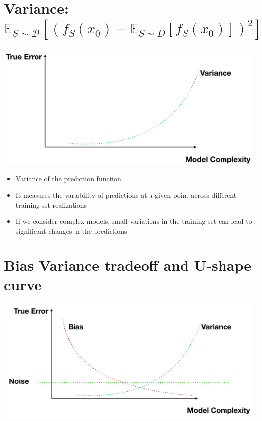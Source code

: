 \documentclass[10pt]{article}
\begin{document}
\section*{Variance: $\mathbb{E}_{S \sim \mathscr{D}}\left[\left(f_{S}\left(x_{0}\right)-\mathbb{E}_{S \sim D}\left[f_{S}\left(x_{0}\right)\right]\right)^{2}\right]$}
\begin{center}
\includegraphics[max width=\textwidth]{2023_12_30_442f876157646883c2c9g-26}
\end{center}

\begin{itemize}
  \item Variance of the prediction function
  \item It measures the variability of predictions at a given point across different training set realizations
  \item If we consider complex models, small variations in the training set can lead to significant changes in the predictions
\end{itemize}

\section*{Bias Variance tradeoff and U-shape curve}
\begin{center}
\includegraphics[max width=\textwidth]{2023_12_30_442f876157646883c2c9g-27}
\end{center}
\end{document}
